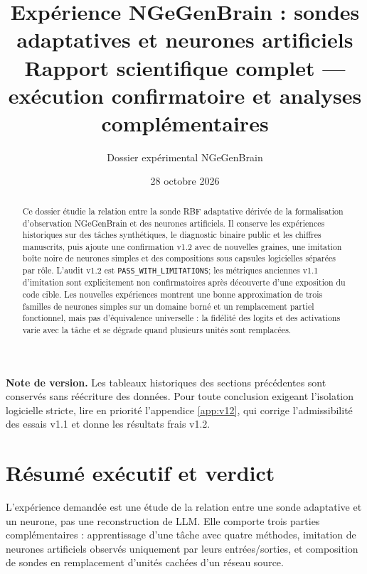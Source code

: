 \documentclass[11pt,a4paper]{article}
\title{\vspace{-1cm}\textcolor{blueNG}{\bfseries Expérience NGeGenBrain : sondes adaptatives et neurones artificiels}\\[.2em]\large Rapport scientifique complet — exécution confirmatoire et analyses complémentaires}
\author{Dossier expérimental NGeGenBrain}
\date{28 octobre 2026}
\begin{document}
\maketitle
\begin{abstract}
Ce dossier étudie la relation entre la sonde RBF adaptative dérivée de la formalisation d'observation NGeGenBrain et des neurones artificiels. Il conserve les expériences historiques sur des tâches synthétiques, le diagnostic binaire public et les chiffres manuscrits, puis ajoute une confirmation v1.2 avec de nouvelles graines, une imitation boîte noire de neurones simples et des compositions sous capsules logicielles séparées par rôle. L'audit v1.2 est \texttt{PASS\_WITH\_LIMITATIONS}; les métriques anciennes v1.1 d'imitation sont explicitement non confirmatoires après découverte d'une exposition du code cible. Les nouvelles expériences montrent une bonne approximation de trois familles de neurones simples sur un domaine borné et un remplacement partiel fonctionnel, mais pas d'équivalence universelle : la fidélité des logits et des activations varie avec la tâche et se dégrade quand plusieurs unités sont remplacées.
\end{abstract}
\tableofcontents\newpage
\noindent\textbf{Note de version.} Les tableaux historiques des sections précédentes sont conservés sans réécriture des données. Pour toute conclusion exigeant l'isolation logicielle stricte, lire en priorité l'appendice \ref{app:v12}, qui corrige l'admissibilité des essais v1.1 et donne les résultats frais v1.2.
\section{Résumé exécutif et verdict}
L'expérience demandée est une étude de la relation entre une sonde adaptative et un neurone, pas une reconstruction de LLM. Elle comporte trois parties complémentaires : apprentissage d'une tâche avec quatre méthodes, imitation de neurones artificiels observés uniquement par leurs entrées/sorties, et composition de sondes en remplacement d'unités cachées d'un réseau source.
\end{document}

